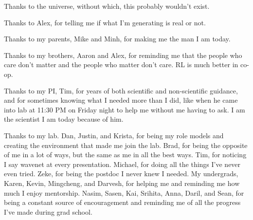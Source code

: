 \begin{frontmatter}
%


%
\tableofcontents
\listoffigures  %



%
%
\begin{acknowledgements}
 Thanks to the universe, without which, this probably wouldn't exist.
 
 Thanks to Alex, for telling me if what I'm generating is real or not.
 
 Thanks to my parents, Mike and Minh, for making me the man I am today.
 
 Thanks to my brothers, Aaron and Alex, for reminding me that the people who care don't matter and the people who matter don't care. RL is much better in co-op.
 
 Thanks to my PI, Tim, for years of both scientific and non-scientific guidance, and for sometimes knowing what I needed more than I did, like when he came into lab at 11:30 PM on Friday night to help me without me having to ask. I am the scientist I am today because of him.
 
 Thanks to my lab. Dan, Justin, and Krista, for being my role models and creating the environment that made me join the lab. Brad, for being the opposite of me in a lot of ways, but the same as me in all the best ways. Tim, for noticing I say wavenet at every presentation. Michael, for doing all the things I've never even tried. Zeke, for being the postdoc I never knew I needed. My undergrads, Karen, Kevin, Mingcheng, and Darvesh, for helping me and reminding me how much I enjoy mentorship. Nasim, Sasen, Kai, Srihita, Anna, Daril, and Sean, for being a constant source of encouragement and reminding me of all the progress I've made during grad school.
 

\end{acknowledgements}
\end{frontmatter}
